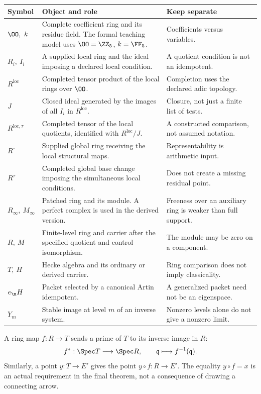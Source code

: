 {\small
\begin{tabularx}{\linewidth}{@{}p{.20\linewidth}Yp{.22\linewidth}@{}}\toprule
\textbf{Symbol} & \textbf{Object and role} & \textbf{Keep separate}\\\midrule
$\OO,\ k$ & Complete coefficient ring and its residue field. The formal teaching model uses $\OO=\ZZ_5$, $k=\FF_5$. & Coefficients versus variables.\\
$R_i,\ I_i$ & A supplied local ring and the ideal imposing a declared local condition. & A quotient condition is not an idempotent.\\
$R^{\mathrm{loc}}$ & Completed tensor product of the local rings over $\OO$. & Completion uses the declared adic topology.\\
$J$ & Closed ideal generated by the images of all $I_i$ in $R^{\mathrm{loc}}$. & Closure, not just a finite list of tests.\\
$R^{\mathrm{loc},\tau}$ & Completed tensor of the local quotients, identified with $R^{\mathrm{loc}}/J$. & A constructed comparison, not assumed notation.\\
$R^\square$ & Supplied global ring receiving the local structural maps. & Representability is arithmetic input.\\
$R^\tau$ & Completed global base change imposing the simultaneous local conditions. & Does not create a missing residual point.\\
$R_\infty,\ M_\infty$ & Patched ring and its module. A perfect complex is used in the derived version. & Freeness over an auxiliary ring is weaker than full support.\\
$R,\ M$ & Finite-level ring and carrier after the specified quotient and control isomorphism. & The module may be zero on a component.\\
$T,\ H$ & Hecke algebra and its ordinary or derived carrier. & Ring comparison does not imply classicality.\\
$e_{\m}H$ & Packet selected by a canonical Artin idempotent. & A generalized packet need not be an eigenspace.\\
$Y_m$ & Stable image at level $m$ of an inverse system. & Nonzero levels alone do not give a nonzero limit.\\\bottomrule
\end{tabularx}}

A ring map $f:R\to T$ sends a prime of $T$ to its inverse image in $R$:
\[
f^*:\Spec T\longrightarrow\Spec R,\qquad \mathfrak q\longmapsto f^{-1}(\mathfrak q).
\]
Similarly, a point $y:T\to E'$ gives the point $y\circ f:R\to E'$. The equality $y\circ f=x$ is an actual requirement in the final theorem, not a consequence of drawing a connecting arrow.

